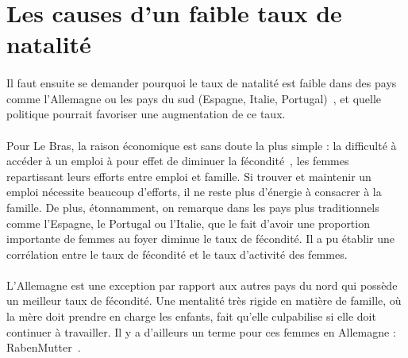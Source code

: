 \section{Les causes d'un faible taux de natalité}
\paragraph{}Il faut ensuite se demander pourquoi le taux de natalité est faible dans des pays comme l’Allemagne ou les pays du sud (Espagne, Italie, Portugal)~\citep{4model}, et quelle politique pourrait favoriser une augmentation de ce taux. 

\paragraph{}Pour Le Bras, la raison économique est sans doute la plus simple : la difficulté à accéder à un emploi à pour effet de diminuer la fécondité~\citep[pp.25]{heran}, les femmes repartissant leurs efforts entre emploi et famille. Si trouver et maintenir un emploi nécessite beaucoup d’efforts, il ne reste plus d’énergie à consacrer à la famille. De plus, étonnamment, on remarque dans les pays plus traditionnels comme l’Espagne, le Portugal ou l’Italie, que le fait d’avoir une proportion importante de femmes au foyer diminue le taux de fécondité. Il a pu établir une corrélation entre le taux de fécondité et le taux d'activité des femmes. 

\paragraph{}L’Allemagne est une exception par rapport aux autres pays du nord qui possède un meilleur taux de fécondité. Une mentalité très rigide en matière de famille, où la mère doit prendre en charge les enfants, fait qu'elle culpabilise si elle doit continuer à travailler. Il y a d’ailleurs un terme pour ces femmes en Allemagne : RabenMutter~\citep{mutter}. 

